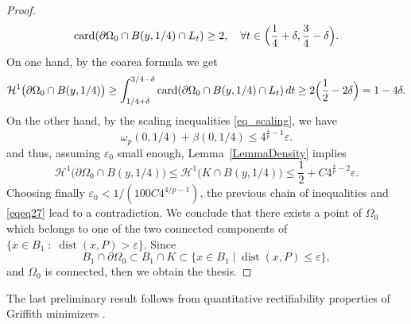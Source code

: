 \documentclass[12pt]{article}
\theoremstyle{definition}
\theoremstyle{remark}
\numberwithin{equation}{section}
\DeclareMathOperator{\dist}{dist}
\newcommand{\dd}{\partial}
\newcommand{\card}[1]{\operatorname{card}(#1)}
\renewcommand{\H}{\mathcal{H}}
\begin{document}
\begin{proof}
\begin{equation}
        \card{\dd\Omega_0 \cap B(y,1/4) \cap L_t} \geq 2,\quad\forall t \in \Bigl(\frac{1}{4} + \delta, \frac{3}{4}- \delta\Bigr).
    \end{equation}
    On one hand, by the coarea formula we get
    \begin{equation}
        \label{eqeq27}
        \H^1\bigl(\dd \Omega_0 \cap B(y,1/4)\bigr)
        \geq \int_{1/4 +\delta}^{3/4 - \delta} \card{\dd\Omega_0 \cap B(y,1/4) \cap L_t}\,dt \geq 2\Bigl(\frac{1}{2}-2\delta\Bigr)=1-4\delta.
    \end{equation}
    On the other hand, by the scaling inequalities \eqref{eq_scaling}, we have
    \begin{equation}
        \omega_p(0,1/4) + \beta(0,1/4) \leq 4^{\frac{4}{p}-1}\varepsilon.
    \end{equation}
    and thus, assuming $\varepsilon_0$ small enough, Lemma~\ref{LemmaDensity} implies
    \begin{equation}
        \H^1\bigl(\dd \Omega_0\cap B(y,1/4)\bigr)\leq \H^1\bigl(K\cap B(y,1/4)\bigr)\leq \frac{1}{2}+ C4^{\frac{4}{p}-2}\varepsilon.
    \end{equation}
    Choosing finally $\varepsilon_0< 1/(100 C4^{4/p - 1})$, the previous chain of inequalities and \eqref{eqeq27} lead to a
    contradiction. We conclude that there exists a point of $\Omega_0$ which belongs to one of the two connected
    components of $\{x\in B_1 \;:\; \dist(x,P) > \varepsilon\}$. Since 
    \begin{equation}
        B_1 \cap \dd\Omega_0 \subset B_1 \cap K \subset \{x \in B_1 \mid \dist(x,P) \leq \varepsilon\},
    \end{equation}
    and $\Omega_0$ is connected, then we obtain the thesis.
\end{proof}

The last preliminary result follows from quantitative rectifiability properties of Griffith minimizers
\cite[Corollary 3.3]{camilleUR}.
\end{document}

